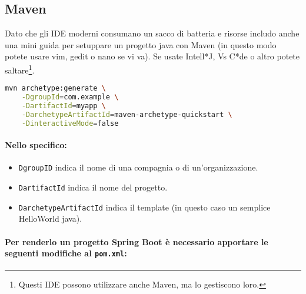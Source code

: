 
\subsection{Maven}

Dato che gli IDE moderni consumano un sacco di batteria e risorse includo anche una mini guida per setuppare un progetto java con Maven (in questo modo potete usare vim, gedit o nano se vi va). Se usate Intell*J, Vs C*de o altro potete saltare\footnote{Questi IDE possono utilizzare anche Maven, ma lo gestiscono loro.}.




\begin{lstlisting}[language=bash, caption={Creazione di un progetto Maven}]
mvn archetype:generate \
    -DgroupId=com.example \
    -DartifactId=myapp \
    -DarchetypeArtifactId=maven-archetype-quickstart \
    -DinteractiveMode=false
\end{lstlisting}

\paragraph{Nello specifico:}

\begin{itemize}
	\item \texttt{DgroupID} indica il nome di una compagnia o di un'organizzazione.
	\item \texttt{DartifactId} indica il nome del progetto.
	\item \texttt{DarchetypeArtifactId} indica il template (in questo caso un semplice HelloWorld java).
\end{itemize}

\paragraph{Per renderlo un progetto Spring Boot è necessario apportare le seguenti modifiche al \texttt{pom.xml}:}

